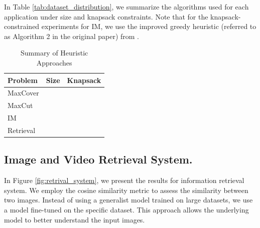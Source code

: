 In Table \ref{tab:dataset_distribution}, we summarize the algorithms used for each application under size and knapsack constraints. Note that for the knapsack-constrained experiments for IM, we use the improved greedy heuristic (referred to as Algorithm 2 in the original paper) from \citet{nguyen2013budgeted}.
\begin{table}[h]
\centering
\caption{Summary of Heuristic Approaches}
\vspace{1em}
\label{tab:heuristics}

\begin{tabular}{lll}
\toprule
Problem   & Size            & Knapsack                 \\ \midrule
MaxCover  & \citet{DBLP:journals/mp/NemhauserWF78}                & \citet{khuller1999budgeted} \\
MaxCut    & \citet{DBLP:journals/mp/NemhauserWF78}                 &   \citet{pham2023linear}   \\
IM        & \citet{tang2015influence} & \citet{nguyen2013budgeted} \\
Retrieval & \citet{DBLP:journals/mp/NemhauserWF78}                & \citet{khuller1999budgeted}                 \\ \bottomrule
\end{tabular}%

\end{table}


\newpage


\subsection{Image and Video Retrieval System.} \label{appendix:retrieval}

In Figure \ref{fig:retrival_system}, we present the results for information retrieval system. We employ the cosine similarity metric to assess the similarity between two images. Instead of using a generalist model trained on large datasets, we use a model fine-tuned on the specific dataset. This approach allows the underlying model to better understand the input images.

